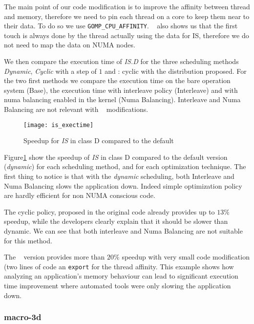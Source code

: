 The main point of our code modification is to improve the affinity between
thread and memory, therefore we need to pin each thread on a core to keep them
near to their data. To do so we use \texttt{GOMP\_CPU\_AFFINITY}. \TABARNAC~
also shows us that the first touch is always done by the thread actually using
the data for IS, therefore we do not need to map the data on NUMA nodes.

We then compare the execution time of \emph{IS.D} for the three scheduling
methods \emph{Dynamic}, \emph{Cyclic} with a step of $1$ and \TABARNAC:
cyclic with the distribution proposed. For the two first methods we compare the
execution time on the bare operation system  (Base), the execution time with
interleave policy (Interleave) and with numa balancing enabled in the kernel
(Numa Balancing). Interleave and Numa Balancing are not relevant with
\TABARNAC~ modifications.

\begin{figure}[htpb]
    \centering
    \texttt{[image: is\_exectime]}
    \caption{Speedup for \emph{IS} in class D compared to the default}
\label{fig:is-res}
\end{figure}

Figure\ref{fig:is-res} show the speedup of \emph{IS} in class D compared to
the default version (\emph{dynamic}) for each scheduling method, and for each
optimization technique. The first thing to notice is that with the
\emph{dynamic} scheduling, both Interleave and Numa Balancing slows
the application down. Indeed simple optimization policy are hardly efficient
for non NUMA conscious code.

The cyclic policy, proposed in the original code already provides up to $13\%$
speedup, while the developers clearly explain that it should be slower than
dynamic. We can see that both interleave and Numa Balancing are not suitable 
for this method.

The \TABARNAC~ version provides more than $20\%$ speedup with very small code
modification (two lines of code an \texttt{export} for the thread affinity.
This example shows how analyzing an application's memory behaviour can lead to
significant execution time improvement where automated tools were only slowing
the application down.

\subsubsection{macro-3d}
\label{sec:exp-macro3d}


